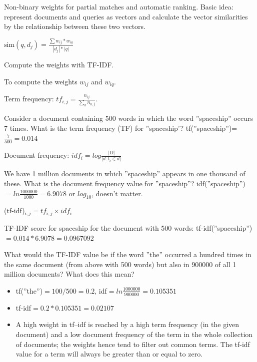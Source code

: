 \begin{breakbox}

Non-binary weights for partial matches and automatic ranking. Basic idea: represent documents and queries as vectors and calculate the vector similarities by the relationship between these two vectors. 

\begin{center}
	$\text{sim}(q, d_j) = \frac{\sum w_{ij}*w_{iq}}{|d_j| * |q|}$
\end{center}
Compute the weights with TF-IDF.
\end{breakbox}

\begin{breakbox}

To compute the weights $w_{ij}$ and $w_{iq}$.

\begin{center}
	Term frequency: $tf_{i,j} = \frac{n_{ij}}{\sum_{k}{} n_{k,j}}$. 
\end{center}

Consider a document containing 500 words in which the word ''spaceship'' occurs 7 times. What is the term frequency (TF) for ''spaceship'? tf(''spaceship'')=$\frac{7}{500} = 0.014$

\begin{center}
	Document frequency: $idf_i = log \frac{|D|}{|{d:t_i \in d}|}$
\end{center}

We have 1 million documents in which ''spaceship'' appears in one thousand of these. What is the document frequency value for ''spaceship''? idf(''spaceship'')$=ln\frac{1000000}{1000}=6.9078$ or $log_{10}$, doesn't matter.

\begin{center}
	(tf-idf)$_{i,j}	= tf_{i,j} \times idf_i$
\end{center}
TF-IDF score for spaceship for the document with 500 words: tf-idf(''spaceship'')$=0.014*6.9078=0.0967092$

What would the TF-IDF value be if the word ''the'' occurred a hundred times in the same document (from above with 500 words) but also in $900000$ of all 1 million documents? What does this mean?

\begin{itemize}
	\item tf(''the'')$=100/500=0.2$, idf$=ln\frac{1000000}{900000}=0.105351$
	\item tf-idf$=0.2*0.105351=0.02107$
	\item A high weight in tf–idf is reached by a high term frequency (in the given document) and a low document frequency of the term in the whole collection of documents; the weights
hence tend to filter out common terms. The tf-idf value for a term will always be greater than or equal to zero.
\end{itemize}
\end{breakbox}